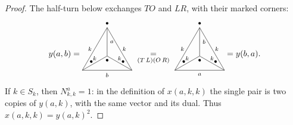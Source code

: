 \documentclass{amsart}
\begin{document}
\begin{proof}
The half-turn below exchanges $TO$ and $LR$, with their marked corners:
\[
y(a,b)=
\begin{tikzpicture}[baseline=.6cm,font=\scriptsize,scale=1.05]
\draw (0,0)--(1,0) node[below] {$b$} --(2,0);
\draw (0,0)--(.5,.866) node[left] {$k$} --(1,1.732);
\draw (2,0)--(1.5,.866) node[right] {$k$} --(1,1.732);
\draw (0,0)--(.5,.2885) node[above] {$k$} --(1,.577);
\draw (2,0)--(1.5,.2885) node[above] {$k$} --(1,.577);
\draw (1,.577)--(1,1.1545) node[right] {$a$} --(1,1.732);
\node[above] at (1,1.732) {$\bullet$};
\node[below] at (1,.577) {$\bullet$};
\node at (.36,.35) {$\bullet$};\node at (1.64,.35) {$\bullet$};
\end{tikzpicture}
\ \underset{(T\,L)(O\,R)}{=}\ 
\begin{tikzpicture}[baseline=.6cm,font=\scriptsize,scale=1.05]
\draw (0,0)--(1,0) node[below] {$a$} --(2,0);
\draw (0,0)--(.5,.866) node[left] {$k$} --(1,1.732);
\draw (2,0)--(1.5,.866) node[right] {$k$} --(1,1.732);
\draw (0,0)--(.5,.2885) node[above] {$k$} --(1,.577);
\draw (2,0)--(1.5,.2885) node[above] {$k$} --(1,.577);
\draw (1,.577)--(1,1.1545) node[right] {$b$} --(1,1.732);
\node[above] at (1,1.732) {$\bullet$};
\node[below] at (1,.577) {$\bullet$};
\node at (.36,.35) {$\bullet$};\node at (1.64,.35) {$\bullet$};
\end{tikzpicture}
=y(b,a).
\]
If $k\in S_k$, then $N_{k,k}^a=1$: in the definition of $x(a,k,k)$ the single pair is two copies of $y(a,k)$, with the same vector and its dual. Thus $x(a,k,k)=y(a,k)^2$.


\end{proof}
\end{document}
